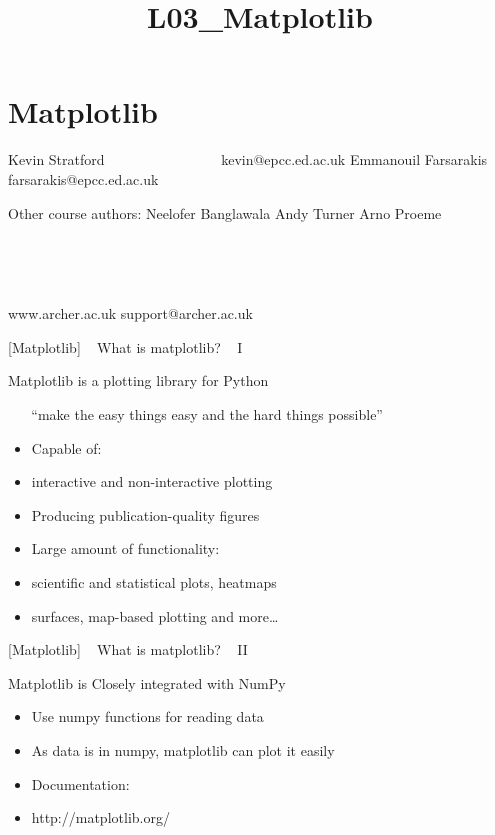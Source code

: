 \documentclass{article}
\title{L03\_Matplotlib}
\begin{document}
    
    
    \maketitle
    
    

    
    \section{Matplotlib }\label{matplotlib}

Kevin Stratford ~ ~ ~ ~ ~ ~ ~ ~ ~ ~kevin@epcc.ed.ac.uk Emmanouil
Farsarakis ~ ~ farsarakis@epcc.ed.ac.uk

Other course authors: Neelofer Banglawala Andy Turner Arno Proeme 

    ~

    ~

www.archer.ac.uk support@archer.ac.uk

 

    {[}Matplotlib{]} ~ What is matplotlib? ~ I

Matplotlib is a plotting library for Python

~ ~ ``make the easy things easy and the hard things possible''

\begin{itemize}
\item
  Capable of:
\item
  interactive and non-interactive plotting
\item
  Producing publication-quality figures
\item
  Large amount of functionality:
\item
  scientific and statistical plots, heatmaps
\item
  surfaces, map-based plotting and more\ldots{}
\end{itemize}

    {[}Matplotlib{]} ~ What is matplotlib? ~ II

Matplotlib is Closely integrated with NumPy

\begin{itemize}
\item
  Use numpy functions for reading data
\item
  As data is in numpy, matplotlib can plot it easily
\item
  Documentation:
\item
  http://matplotlib.org/
\end{itemize}
\end{document}
